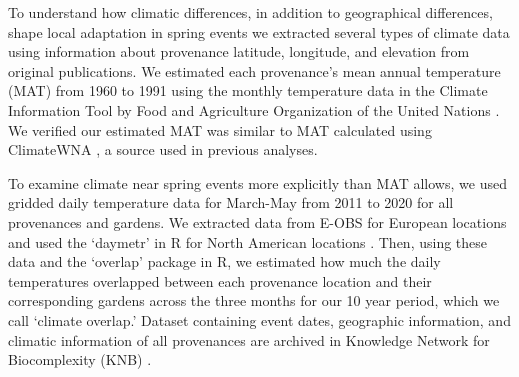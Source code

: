 \documentclass{article}
\begin{document}
To understand how climatic differences, in addition to geographical differences, shape local adaptation in spring events we extracted several types of climate data using information about provenance latitude, longitude, and elevation from original publications. We estimated each provenance's mean annual temperature (MAT) from 1960 to 1991 using the monthly temperature data in the Climate Information Tool by Food and Agriculture Organization of the United Nations \citep{FAO2022}. We verified our estimated MAT was similar to MAT calculated using ClimateWNA \citep{wang2016}, a source used in previous analyses. 

To examine climate near spring events more explicitly than MAT allows, we used gridded daily temperature data for March-May from 2011 to 2020 for all provenances and gardens. We extracted data from E-OBS for European locations and used the `daymetr' in R for North American locations \citep{cornes2018,hufkens2018}. Then, using these data and the `overlap' package in R, we estimated how much the daily temperatures overlapped between each provenance location and their corresponding gardens across the three months for our 10 year period, which we call `climate overlap.' Dataset containing event dates, geographic information, and climatic information of all provenances are archived in  Knowledge Network for Biocomplexity (KNB) \citep{zeng23}.  %
\end{document}
